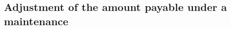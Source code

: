 \documentclass[12pt,a4paper]{article}
\begin{document}
\subsection[10. Adjustment of the amount payable under a maintenance \opt{oldrules}{assessment}\opt{newrules}{calculation}]{Adjustment of the amount payable under a maintenance }  %

%
%
%
%
%
%
\end{document}

